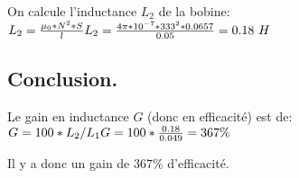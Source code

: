 On calcule l'inductance $L_{2}$ de la bobine: \\
\begin{math}
	L_{2} = \frac{\mu_0*N^2*S}{l} \\
	L_{2} = \frac{4\pi*10^{-7}*333^2*0.0657}{0.05}= 0.18\ H
\end{math}

\subsection{Conclusion.}
Le gain en inductance $G$ (donc en efficacité) est de: \\
\begin{math}
	G = 100*L_{2}/L_{1} \\
	G = 100 * \frac{0.18}{0.049} = 367\%
\end{math}

Il y a donc un gain de $367\%$ d'efficacité.

